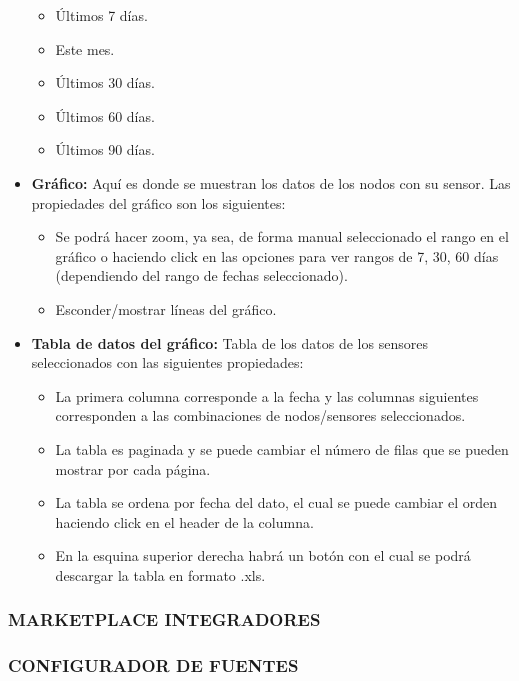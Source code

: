 \begin{itemize}
          \begin{itemize}
              \item Últimos 7 días.
              \item Este mes.
              \item Últimos 30 días.
              \item Últimos 60 días.
              \item Últimos 90 días.
          \end{itemize}
    \item \textbf{Gráfico:} Aquí es donde se muestran los datos de los nodos con su sensor. Las propiedades del gráfico son los siguientes:
          \begin{itemize}
              \item Se podrá hacer zoom, ya sea, de forma manual seleccionado el rango en el gráfico o haciendo click en las opciones para ver rangos de 7, 30, 60 días (dependiendo del rango de fechas seleccionado).
              \item Esconder/mostrar líneas del gráfico.
          \end{itemize}
    \item \textbf{Tabla de datos del gráfico:} Tabla de los datos de los sensores seleccionados con las siguientes propiedades:
          \begin{itemize}
              \item La primera columna corresponde a la fecha y las columnas siguientes corresponden a las combinaciones de nodos/sensores seleccionados.
              \item La tabla es paginada y se puede cambiar el número de filas que se pueden mostrar por cada página.
              \item La tabla se ordena por fecha del dato, el cual se puede cambiar el orden haciendo click en el header de la columna.
              \item En la esquina superior derecha habrá un botón con el cual se podrá descargar la tabla en formato .xls.
          \end{itemize}
\end{itemize}

\subsubsection{MARKETPLACE INTEGRADORES}



\subsubsection{CONFIGURADOR DE FUENTES}

